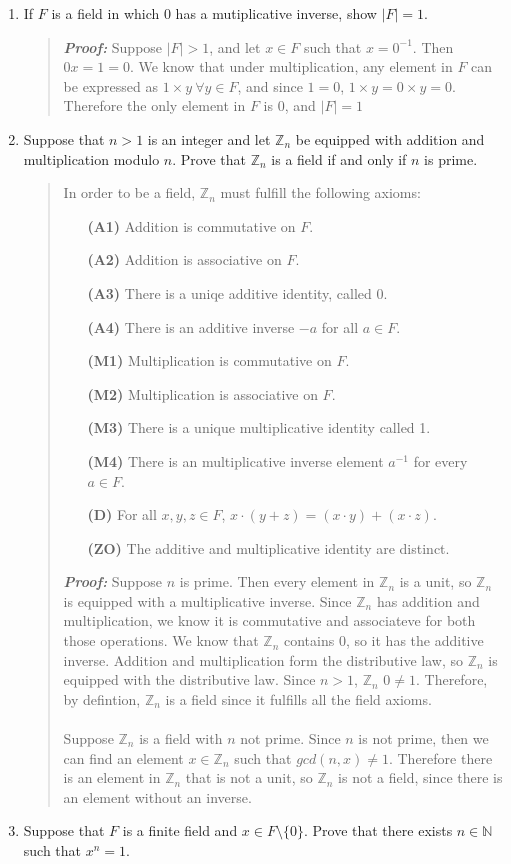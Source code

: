 \documentclass{article}
\newcommand{\ZZ}{\mathbb{Z}}
\newcommand{\NN}{\mathbb{N}}
\begin{document}
\begin{enumerate}
\item If $F$ is a field in which 0 has a mutiplicative inverse, show $|F|=1$.
\begin{quote}
\textbf{\textit{Proof:}} Suppose $|F|>1$, and let $x\in F$ such that $x=0^{-1}$. Then $0x=1=0$. We know that under multiplication, any element in $F$ can be expressed as $1\times y\ \forall y\in F$, and since $1=0$, $1\times y = 0 \times y = 0$. Therefore the only element in $F$ is 0, and $|F|=1$
\end{quote}

\item Suppose that $n>1$ is an integer and let $\ZZ_{n}$ be equipped with addition and multiplication modulo $n$. Prove that $\ZZ_{n}$ is a field if and only if $n$ is prime.
\begin{quote}
In order to be a field, $\ZZ_{n}$ must fulfill the following axioms:
\begin{enumerate}
\item[\textbf{(A1)}] Addition is commutative on $F$.
\item[\textbf{(A2)}] Addition is associative on $F$.
\item[\textbf{(A3)}] There is a uniqe additive identity, called 0.
\item[\textbf{(A4)}] There is an additive inverse $-a$ for all $a\in F$.
\item[\textbf{(M1)}] Multiplication is commutative on $F$.
\item[\textbf{(M2)}] Multiplication is associative on $F$.
\item[\textbf{(M3)}] There is a unique multiplicative identity called 1.
\item[\textbf{(M4)}] There is an multiplicative inverse element $a^{-1}$ for every $a\in F$.
\item[\textbf{(D)}] For all $x,y,z\in F$, $x\cdot(y+z)=(x\cdot y)+(x\cdot z)$.
\item[\textbf{(ZO)}] The additive and multiplicative identity are distinct.
\end{enumerate}

\textbf{\textit{Proof:}} Suppose $n$ is prime. Then every element in $\ZZ_{n}$ is a unit, so $\ZZ_{n}$ is equipped with a multiplicative inverse. Since $\ZZ_{n}$ has addition and multiplication, we know it is commutative and associateve for both those operations. We know that $\ZZ_{n}$ contains 0, so it has the additive inverse. Addition and multiplication form the distributive law, so $\ZZ_{n}$ is equipped with the distributive law. Since $n>1$, $\ZZ_{n}$ $0\neq1$. Therefore, by defintion, $\ZZ_{n}$ is a field since it fulfills all the field axioms.\\\\
Suppose $\ZZ_{n}$ is a field with $n$ not prime. Since $n$ is not prime, then we can find an element $x\in\ZZ_{n}$ such that $gcd(n,x)\neq1$. Therefore there is an element in $\ZZ_{n}$ that is not a unit, so $\ZZ_{n}$ is not a field, since there is an element without an inverse.
\end{quote}

\item Suppose that $F$ is a finite field and $x\in F\setminus\{0\}$. Prove that there exists $n\in\NN$ such that $x^{n}=1$.
\end{enumerate}
\end{document}

